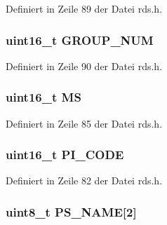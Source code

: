 Definiert in Zeile 89 der Datei rds.\+h.

\hypertarget{structgroup__0b_a9f692e9f76ee88348d426bcd4e9bc70b}{}
\subsubsection[{G\+R\+O\+U\+P\+\_\+\+N\+U\+M}]{\setlength{\rightskip}{0pt plus 5cm}uint16\+\_\+t G\+R\+O\+U\+P\+\_\+\+N\+U\+M}\label{structgroup__0b_a9f692e9f76ee88348d426bcd4e9bc70b}


Definiert in Zeile 90 der Datei rds.\+h.

\hypertarget{structgroup__0b_a0d87191040df43fdd9f67487d0cc1a45}{}
\subsubsection[{M\+S}]{\setlength{\rightskip}{0pt plus 5cm}uint16\+\_\+t M\+S}\label{structgroup__0b_a0d87191040df43fdd9f67487d0cc1a45}


Definiert in Zeile 85 der Datei rds.\+h.

\hypertarget{structgroup__0b_a5cd9b1f6413028425796c1129aa8fd87}{}
\subsubsection[{P\+I\+\_\+\+C\+O\+D\+E}]{\setlength{\rightskip}{0pt plus 5cm}uint16\+\_\+t P\+I\+\_\+\+C\+O\+D\+E}\label{structgroup__0b_a5cd9b1f6413028425796c1129aa8fd87}


Definiert in Zeile 82 der Datei rds.\+h.

\hypertarget{structgroup__0b_a80447425671c19133df16d620705bb09}{}
\subsubsection[{P\+S\+\_\+\+N\+A\+M\+E}]{\setlength{\rightskip}{0pt plus 5cm}uint8\+\_\+t P\+S\+\_\+\+N\+A\+M\+E\mbox{[}2\mbox{]}}\label{structgroup__0b_a80447425671c19133df16d620705bb09}


